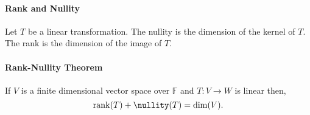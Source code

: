 \paragraph{Rank and Nullity}
Let \(T\) be a linear transformation. The nullity is the dimension
of the kernel of \(T\).
The rank is the dimension of the image of \(T\).

\paragraph{Rank-Nullity Theorem}
If \(V\) is a finite dimensional vector space over \(\mathbb{F}\) and
\(T: V \to W\) is linear then,
\[\rank(T) + \nullity(T) = \dim(V).\]

